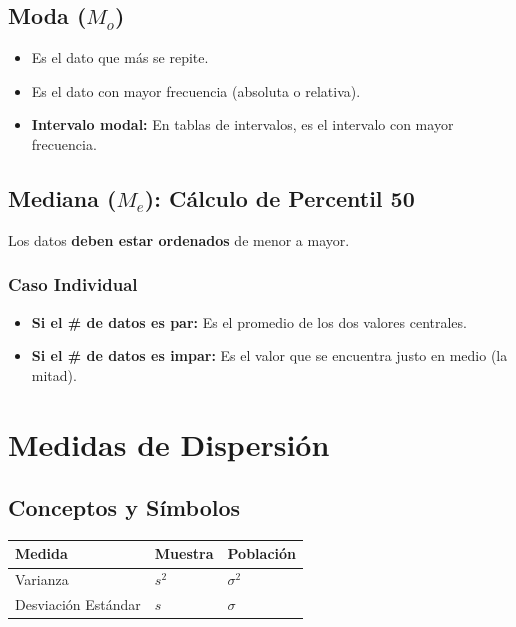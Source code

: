 \documentclass[11pt]{article}
\begin{document}
\subsection{Moda (\(M_o\))}
\label{sec:org37db3ed}
\begin{itemize}
\item Es el dato que más se repite.
\item Es el dato con mayor frecuencia (absoluta o relativa).
\item \textbf{Intervalo modal:} En tablas de intervalos, es el intervalo con mayor frecuencia.
\end{itemize}

\subsection{Mediana (\(M_e\)): Cálculo de Percentil 50}
\label{sec:org1ff2e72}
\begin{IMPORTANT}
Los datos \textbf{deben estar ordenados} de menor a mayor.
\end{IMPORTANT}

\subsubsection{Caso Individual}
\label{sec:orgd76eaf5}
\begin{itemize}
\item \textbf{Si el \# de datos es par:} Es el promedio de los dos valores centrales.
\item \textbf{Si el \# de datos es impar:} Es el valor que se encuentra justo en medio (la mitad).
\end{itemize}


\section{Medidas de Dispersión}
\label{sec:org99c1bcd}
\subsection{Conceptos y Símbolos}
\label{sec:org99ae5c1}
\begin{center}
\begin{tabular}{lll}
Medida & Muestra & Población\\[0pt]
\hline
Varianza & \(s^2\) & \(\sigma^2\)\\[0pt]
Desviación Estándar & \(s\) & \(\sigma\)\\[0pt]
\end{tabular}
\end{center}
\end{document}
